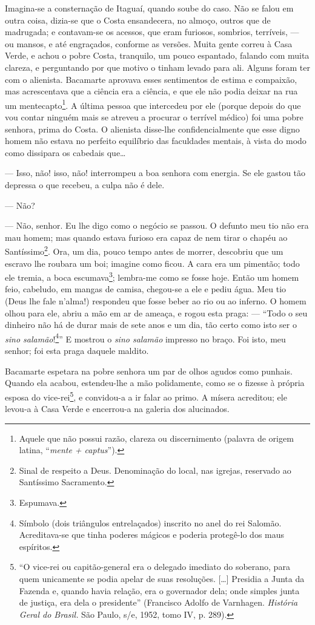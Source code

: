 Imagina-se a consternação de Itaguaí, quando soube do caso. Não se falou
em outra coisa, dizia-se que o Costa ensandecera, no almoço, outros que
de madrugada; e contavam-se os acessos, que eram furiosos, sombrios,
terríveis, --- ou mansos, e até engraçados, conforme as versões. Muita
gente correu à Casa Verde, e achou o pobre Costa, tranquilo, um pouco
espantado, falando com muita clareza, e perguntando por que motivo o
tinham levado para ali. Alguns foram ter com o alienista. Bacamarte
aprovava esses sentimentos de estima e compaixão, mas acrescentava que a
ciência era a ciência, e que ele não podia deixar na rua um
mentecapto\footnote{Aquele que não possui razão, clareza ou
  discernimento (palavra de origem latina, ``\emph{mente + captus}'').}.
A última pessoa que intercedeu por ele (porque depois do que vou contar
ninguém mais se atreveu a procurar o terrível médico) foi uma pobre
senhora, prima do Costa. O alienista disse-lhe confidencialmente que
esse digno homem não estava no perfeito equilíbrio das faculdades
mentais, à vista do modo como dissipara os cabedais que\ldots{}

--- Isso, não! isso, não! interrompeu a boa senhora com energia. Se ele
gastou tão depressa o que recebeu, a culpa não é dele.

--- Não?

--- Não, senhor. Eu lhe digo como o negócio se passou. O defunto meu tio
não era mau homem; mas quando estava furioso era capaz de nem tirar o
chapéu ao Santíssimo\footnote{Sinal de respeito a Deus. Denominação do
  local, nas igrejas, reservado ao Santíssimo Sacramento.}. Ora, um dia,
pouco tempo antes de morrer, descobriu que um escravo lhe roubara um
boi; imagine como ficou. A cara era um pimentão; todo ele tremia, a boca
escumava\footnote{Espumava.}; lembra-me como se fosse hoje. Então um
homem feio, cabeludo, em mangas de camisa, chegou-se a ele e pediu água.
Meu tio (Deus lhe fale n'alma!) respondeu que fosse beber ao rio ou ao
inferno. O homem olhou para ele, abriu a mão em ar de ameaça, e rogou
esta praga: --- ``Todo o seu dinheiro não há de durar mais de sete anos
e um dia, tão certo como isto ser o \emph{sino salamão}!\footnote{Símbolo
  (dois triângulos entrelaçados) inscrito no anel do rei Salomão.
  Acreditava-se que tinha poderes mágicos e poderia protegê-lo dos maus
  espíritos.}'' E mostrou o \emph{sino salamão} impresso no braço. Foi
isto, meu senhor; foi esta praga daquele maldito.

Bacamarte espetara na pobre senhora um par de olhos agudos como punhais.
Quando ela acabou, estendeu-lhe a mão polidamente, como se o fizesse à
própria esposa do vice-rei\footnote{``O vice-rei ou capitão-general era
  o delegado imediato do soberano, para quem unicamente se podia apelar
  de suas resoluções. {[}\ldots{}{]} Presidia a Junta da Fazenda e,
  quando havia relação, era o governador dela; onde simples junta de
  justiça, era dela o presidente'' (Francisco Adolfo de Varnhagen.
  \emph{História Geral do Brasil.} São Paulo, s/e, 1952, tomo IV, p.
  289).}, e convidou-a a ir falar ao primo. A mísera acreditou; ele
levou-a à Casa Verde e encerrou-a na galeria dos alucinados.

